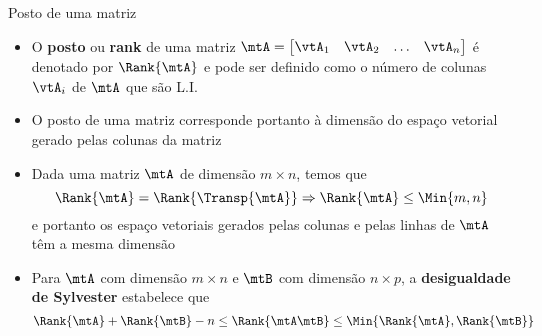\begin{frame}{Posto de uma matriz}
  \begin{itemize}
    \item O \textbf{\alert{posto}} ou \textbf{\alert{rank}} de uma matriz $\mtA = \left[\begin{matrix} \vtA_1 & \vtA_2 & \ldots & \vtA_n\end{matrix}\right]$ é denotado por $\Rank{\mtA}$ e pode ser definido como o número de colunas $\vtA_i$ de $\mtA$ que são L.I.
    \item O posto de uma matriz corresponde portanto à dimensão do espaço vetorial gerado pelas colunas da matriz
    \item Dada uma matriz $\mtA$ de dimensão $m\times n$, temos que
    \begin{equation}\label{eq_rank_transp}
      \Rank{\mtA} = \Rank{\Transp{\mtA}} \Rightarrow \Rank{\mtA} \leq \Min{m,n}
    \end{equation}
    e portanto os espaço vetoriais gerados pelas colunas e pelas linhas de $\mtA$ têm a mesma dimensão
    \item Para $\mtA$ com dimensão $m \times n$ e $\mtB$ com dimensão $n \times p$, a \textbf{\alert{desigualdade de Sylvester}} estabelece que
    \begin{equation}\label{eq_sylvester}
      \Rank{\mtA} + \Rank{\mtB} - n \leq \Rank{\mtA\mtB} \leq \Min{\Rank{\mtA},\Rank{\mtB}}
    \end{equation}
  \end{itemize}
\end{frame}

